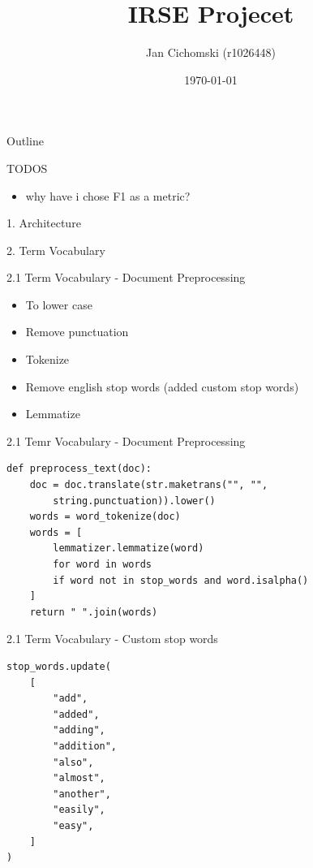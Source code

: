\documentclass{beamer}
\title{IRSE Projecet}
\author{Jan Cichomski (r1026448)}
\date{\today}
\begin{document}
\begin{frame}
  \titlepage
\end{frame}

\begin{frame}{Outline}
  \tableofcontents
\end{frame}
\begin{frame}{TODOS}
  \begin{itemize}
    \item  why have i chose F1 as a metric?
  \end{itemize}
\end{frame}

\begin{frame}{1. Architecture}
  \centering
  
\end{frame}

\begin{frame}{2. Term Vocabulary}

\end{frame}

\begin{frame}{2.1 Term Vocabulary - Document Preprocessing}
  \begin{itemize}
    \item To lower case
    \item Remove punctuation
    \item Tokenize
    \item Remove english stop words (added custom stop words)
    \item Lemmatize
  \end{itemize}
\end{frame}

\begin{frame}[fragile]{2.1 Temr Vocabulary - Document Preprocessing}
  \begin{verbatim}
def preprocess_text(doc):
    doc = doc.translate(str.maketrans("", "",
        string.punctuation)).lower()
    words = word_tokenize(doc)
    words = [
        lemmatizer.lemmatize(word)
        for word in words
        if word not in stop_words and word.isalpha()
    ]
    return " ".join(words)
    \end{verbatim}
\end{frame}
\begin{frame}[fragile]{2.1 Term Vocabulary - Custom stop words}
  \begin{verbatim}
stop_words.update(
    [
        "add",
        "added",
        "adding",
        "addition",
        "also",
        "almost",
        "another",
        "easily",
        "easy",
    ]
)
    \end{verbatim}
\end{frame}
\end{document}
